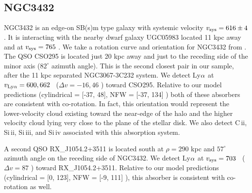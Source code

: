 \subsection{NGC3432}
NGC3432 is an edge-on SB(s)m type galaxy with systemic velocity $v_{\rm sys} = 616 \pm 4$ \kms. It is interacting with the nearby dwarf galaxy UGC05983 located 11 kpc away and at $v_{\rm sys} = 765$ \kms. We take a rotation curve and orientation for NGC3432 from \cite{rhee1996}. The QSO CSO295 is located just 20 kpc away and just to the receding side of the minor axis ($82^{\circ}$ azimuth angle). This is the second closest pair in our sample, after the 11 kpc separated NGC3067-3C232 system. We detect Ly$\rm \alpha$ at $v_{\rm Ly\alpha} = 600, 662$ \kms~($\Delta v = -16, 46$ \kms) toward CSO295. Relative to our model predictions (cylindrical = [-37, 48], NFW = [-37, 134] \kms) both of these absorbers are consistent with co-rotation. In fact, this orientation would represent the lower-velocity cloud existing toward the near-edge of the halo and the higher velocity cloud lying very close to the plane of the stellar disk. We also detect C\,{\sc ii}, Si\,{\sc ii}, Si\,{\sc iii}, and Si\,{\sc iv} associated with this absorption system.

A second QSO RX\_J1054.2+3511 is located south at $\rho = 290$ kpc and $57^{\circ}$ azimuth angle on the receding side of NGC3432. We detect Ly$\rm \alpha$ at $v_{\rm sys} = 703$ \kms~($\Delta v = 87$ \kms) toward RX\_J1054.2+3511. Relative to our model predictions (cylindrical = [0, 123], NFW = [-9, 111] \kms), this absorber is consistent with co-rotation as well. \\




